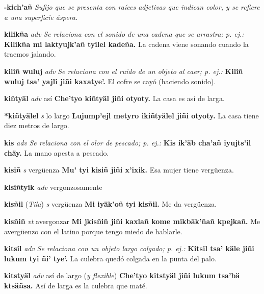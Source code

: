 \documentclass[10pt]{scrbook}
\newcommand{\entry}[1]{\textbf{#1}}
\newcommand{\nontranslationdef}[1]{\textit{#1}}
\newcommand{\partofspeech}[1]{\textit{#1}}
\newcommand{\spanishtranslation}[1]{#1}
\newcommand{\clarification}[1]{(\textit{#1})}
\newcommand{\cholexample}[1]{\textbf{#1}}
\newcommand{\exampletranslation}[1]{#1}
\newcommand{\relevantdialect}[1]{(\textit{#1})}
\begin{document}
\begin{multicols}{2}
\entry{-kich'añ}
\nontranslationdef{Sufijo que se presenta con raíces adjetivas que indican color, y se refiere a una superficie áspera.}

\entry{kilikña}
\partofspeech{adv}
\nontranslationdef{Se relaciona con el sonido de una cadena que se arrastra; p. ej.:}
\cholexample{Kilikña mi laktyujk'añ tyilel kadeña.}
\exampletranslation{La cadena viene sonando cuando la traemos jalando.}

\entry{kiliñ wuluj}
\partofspeech{adv}
\nontranslationdef{Se relaciona con el ruido de un objeto al caer; p. ej.:}
\cholexample{Kiliñ wuluj tsa' yajli jiñi kaxatye'.}
\exampletranslation{El cofre se cayó (haciendo sonido).}

\entry{kiñtyäl}
\partofspeech{adv}
\spanishtranslation{así}
\cholexample{Che'tyo kiñtyäl jiñi otyoty.}
\exampletranslation{La casa es así de larga.}

\entry{*kiñtyälel}
\partofspeech{s}
\spanishtranslation{lo largo}
\cholexample{Lujump'ejl metyro ikiñtyälel jiñi otyoty.}
\exampletranslation{La casa tiene diez metros de largo.}

\entry{kis}
\partofspeech{adv}
\nontranslationdef{Se relaciona con el olor de pescado; p. ej.:}
\cholexample{Kis ik'äb cha'añ iyujts'il chäy.}
\exampletranslation{La mano apesta a pescado.}

\entry{kisiñ}
\partofspeech{s}
\spanishtranslation{vergüenza}
\cholexample{Mu' tyi kisiñ jiñi x'ixik.}
\exampletranslation{Esa mujer tiene vergüenza.}

\entry{kisiñtyik}
\partofspeech{adv}
\spanishtranslation{vergonzosamente}

\entry{kisñil}
\relevantdialect{Tila}
\partofspeech{s}
\spanishtranslation{vergüenza}
\cholexample{Mi iyäk'oñ tyi kisñil.}
\exampletranslation{Me da vergüenza.}

\entry{kisñiñ}
\partofspeech{vt}
\spanishtranslation{avergonzar}
\cholexample{Mi jkisñiñ jiñi kaxlañ kome mikbäk'ñañ kpejkañ.}
\exampletranslation{Me avergüenzo con el latino porque tengo miedo de hablarle.}

\entry{kitsil}
\partofspeech{adv}
\nontranslationdef{Se relaciona con un objeto largo colgado; p. ej.:}
\cholexample{Kitsil tsa' käle jiñi lukum tyi ñi' tye'.}
\exampletranslation{La culebra quedó colgada en la punta del palo.}

\entry{kitstyäl}
\partofspeech{adv}
\spanishtranslation{así de largo}
\clarification{y flexible}
\cholexample{Che'tyo kitstyäl jiñi lukum tsa'bä ktsäñsa.}
\exampletranslation{Así de larga es la culebra que maté.}


\end{multicols}
\end{document}
